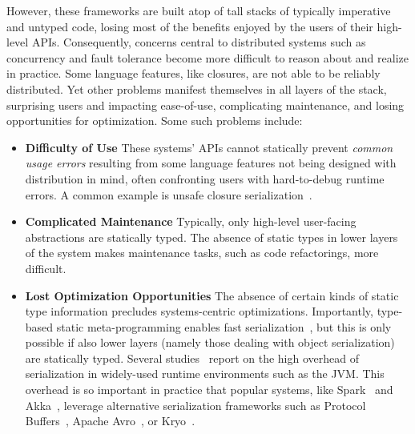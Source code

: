 \documentclass[preprint]{sigplanconf}
\theoremstyle{definition}
\theoremstyle{definition}
\begin{document}



However, these frameworks are built atop of tall stacks of typically
imperative and untyped code, losing most of the benefits enjoyed by the users
of their high-level APIs. Consequently, concerns central to distributed
systems such as concurrency and fault tolerance become more difficult to
reason about and realize in practice. Some language features, like closures,
are not able to be reliably distributed. Yet other problems manifest themselves
in all layers of the stack, surprising users and impacting ease-of-use,
complicating maintenance, and losing opportunities for optimization. Some such
problems include:

\begin{itemize}

\item {\bf Difficulty of Use} These systems' APIs cannot statically prevent
{\em common usage errors} resulting from some language features not being
designed with distribution in mind, often confronting users with hard-to-debug
runtime errors. A common example is unsafe closure
serialization~\cite{Spores}.

\item {\bf Complicated Maintenance} Typically, only high-level user-facing
abstractions are statically typed.  The absence of static types in lower
layers of the system makes maintenance tasks, such as code refactorings, more
difficult.

\item {\bf Lost Optimization Opportunities} The absence of certain kinds of
static type information precludes systems-centric optimizations. Importantly,
type-based static meta-programming enables fast serialization~\cite{Pickling},
but this is only possible if also lower layers (namely those dealing with
object serialization) are statically typed. Several
studies~\cite{JavaSerialization, JavaRMI, MoreEfficientJavaRMI, Jaguar} report
on the high overhead of serialization in widely-used runtime environments such
as the JVM. This overhead is so important in practice that popular systems,
like Spark~\cite{Spark} and Akka~\cite{Akka}, leverage alternative
serialization frameworks such as Protocol Buffers~\cite{Protobuf}, Apache
Avro~\cite{Avro}, or Kryo~\cite{Kryo}.

\end{itemize}
\end{document}
